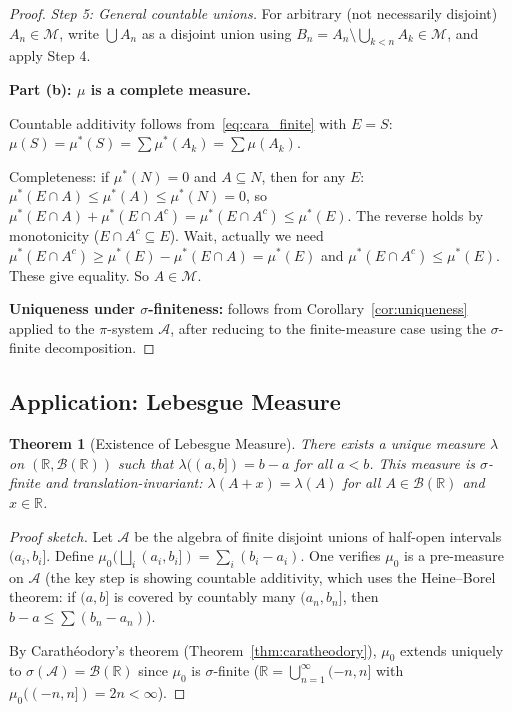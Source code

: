 \documentclass[11pt,a4paper]{article}
\theoremstyle{definition}
\theoremstyle{plain}
\newtheorem{theorem}{Theorem}[section]
\theoremstyle{remark}
\newcommand{\R}{\mathbb{R}}
\newcommand{\Borel}{\mathcal{B}}
\begin{document}
\begin{proof}
\textit{Step 5: General countable unions.} For arbitrary (not necessarily disjoint)
$A_n \in \mathcal{M}$, write $\bigcup A_n$ as a disjoint union using $B_n = A_n \setminus \bigcup_{k<n} A_k \in \mathcal{M}$, and apply Step 4.

\textbf{Part (b): $\mu$ is a complete measure.}

Countable additivity follows from~\eqref{eq:cara_finite} with $E = S$:
$\mu(S) = \mu^*(S) = \sum \mu^*(A_k) = \sum \mu(A_k)$.

Completeness: if $\mu^*(N) = 0$ and $A \subseteq N$, then for any $E$:
$\mu^*(E \cap A) \leq \mu^*(A) \leq \mu^*(N) = 0$, so
$\mu^*(E \cap A) + \mu^*(E \cap A^c) = \mu^*(E \cap A^c) \leq \mu^*(E)$.
The reverse holds by monotonicity ($E \cap A^c \subseteq E$). Wait, actually we need
$\mu^*(E \cap A^c) \geq \mu^*(E) - \mu^*(E \cap A) = \mu^*(E)$ and $\mu^*(E \cap A^c) \leq \mu^*(E)$. These give equality. So $A \in \mathcal{M}$.

\textbf{Uniqueness under $\sigma$-finiteness:} follows from Corollary~\ref{cor:uniqueness}
applied to the $\pi$-system $\mathcal{A}$, after reducing to the finite-measure case
using the $\sigma$-finite decomposition.
\end{proof}

\subsection{Application: Lebesgue Measure}
\label{subsec:lebesgue}

\begin{theorem}[Existence of Lebesgue Measure]
\label{thm:lebesgue}
There exists a unique measure $\lambda$ on $(\R, \Borel(\R))$ such that
$\lambda((a, b]) = b - a$ for all $a < b$. This measure is $\sigma$-finite and
translation-invariant: $\lambda(A + x) = \lambda(A)$ for all $A \in \Borel(\R)$
and $x \in \R$.
\end{theorem}

\begin{proof}[Proof sketch]
Let $\mathcal{A}$ be the algebra of finite disjoint unions of half-open intervals
$(a_i, b_i]$. Define $\mu_0(\bigsqcup_i (a_i, b_i]) = \sum_i (b_i - a_i)$. One
verifies $\mu_0$ is a pre-measure on $\mathcal{A}$ (the key step is showing
countable additivity, which uses the Heine--Borel theorem: if $(a, b]$ is covered
by countably many $(a_n, b_n]$, then $b - a \leq \sum (b_n - a_n)$).

By Carath\'{e}odory's theorem (Theorem~\ref{thm:caratheodory}), $\mu_0$ extends
uniquely to $\sigma(\mathcal{A}) = \Borel(\R)$ since $\mu_0$ is $\sigma$-finite
($\R = \bigcup_{n=1}^\infty (-n, n]$ with $\mu_0((-n, n]) = 2n < \infty$).
\end{proof}
\end{document}
